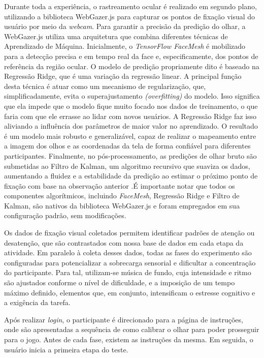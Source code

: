 Durante toda a experiência, o rastreamento ocular é realizado em segundo plano, utilizando a biblioteca WebGazer.js para capturar os pontos de fixação visual do usuário por meio da \textit{webcam}. Para garantir a precisão da predição do olhar, a WebGazer.js utiliza uma arquitetura que combina diferentes técnicas de Aprendizado de Máquina. Inicialmente, o \textit{TensorFlow FaceMesh} é mobilizado para a detecção precisa e em tempo real da face e, especificamente, dos pontos de referência da região ocular. O modelo de predição propriamente dito é baseado na Regressão Ridge, que é uma variação da regressão linear. A principal função desta técnica é atuar como um mecanismo de regularização, que, simplificadamente, evita o superajustamento \textit{(overfitting)} do modelo. Isso significa que ela impede que o modelo fique muito focado nos dados de treinamento, o que faria com que ele errasse ao lidar com novos usuários. A Regressão Ridge faz isso aliviando a influência dos parâmetros de maior valor no aprendizado. O resultado é um modelo mais robusto e generalizável, capaz de realizar o mapeamento entre a imagem dos olhos e as coordenadas da tela de forma confiável para diferentes participantes. Finalmente, no pós-processamento, as predições de olhar bruto são submetidas ao Filtro de Kalman, um algoritmo recursivo que suaviza os dados, aumentando a fluidez e a estabilidade da predição ao estimar o próximo ponto de fixação com base na observação anterior \cite{WebGazerDoc}.É importante notar que todos os componentes algorítmicos, incluindo \textit{FaceMesh}, Regressão Ridge e Filtro de Kalman, são nativos da biblioteca WebGazer.js e foram empregados em sua configuração padrão, sem modificações.

Os dados de fixação visual coletados permitem identificar padrões de atenção ou desatenção, que são contrastados com nossa base de dados em cada etapa da atividade. Em paralelo à coleta desses dados, todas as fases do experimento são configuradas para potencializar a sobrecarga sensorial e dificultar a concentração do participante. Para tal, utilizam-se música de fundo, cuja intensidade e ritmo são ajustados conforme o nível de dificuldade, e a imposição de um tempo máximo definido, elementos que, em conjunto, intensificam o estresse cognitivo e a exigência da tarefa.

Após realizar \textit{login}, o participante é direcionado para a página de instruções, onde são apresentadas a sequência de como calibrar o olhar para poder prosseguir para o jogo. Antes de cada fase, existem as instruções da mesma. Em seguida, o usuário inicia a primeira etapa do teste. 

